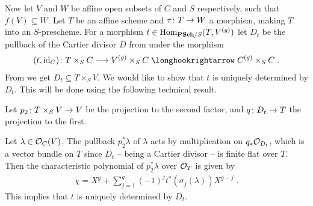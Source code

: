 \documentclass[a4paper,parskip=half,numbers=enddot, DIV=12]{scrreprt}
\begin{document}
Now let $V$ and $W$ be affine open subsets of $C$ and $S$ respectively, such that $f(V)\subseteq W$. Let $T$ be an affine scheme and $\tau\colon T\morphism W$ a morphism, making $T$ into an $S$-prescheme. For a morphism $t\in \Hom_{\cat{PSch}/S}(T,V^{(g)})$ let $D_t$ be the pullback of the Cartier divisor $D$ from  under the morphism
\begin{align*}
	(t,\id_C)\colon T\times_SC\morphism V^{(g)}\times_SC\monomorphism C^{(g)}\times_SC\;.
\end{align*}
From  we get $D_t\subseteq T\times_SV$. We would like to show that $t$ is uniquely determined by $D_t$. This will be done using the following technical result.
\setcounter{thm}{11}
\begin{thm}[continuation]
	Let $p_2\colon T\times_SV\morphism V$ be the projection to the second factor, and $q\colon D_t\morphism T$ the projection to the first.
	\begin{alphanumerate}\setcounter{enumi}{4}
		\item Let $\lambda\in\mathcal{O}_C(V)$. The pullback $p_2^*\lambda$ of $\lambda$ acts by multiplication on $q_*\mathcal{O}_{D_t}$, which is a vector bundle on $T$ since $D_t$ -- being a Cartier divisor -- is finite flat over $T$. Then the characteristic polynomial of $p_2^*\lambda$ over $\mathcal{O}_T$ is given by
		\begin{align*}
			\chi=X^g+\sum_{j=1}^g(-1)^jt^*(\sigma_j(\lambda))X^{g-j}\;.
		\end{align*}
		This implies that $t$ is uniquely determined by $D_t$.
	\end{alphanumerate}
\end{thm}
\end{document}
